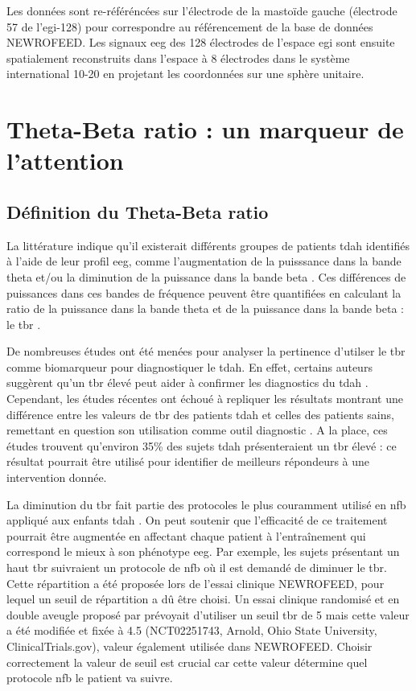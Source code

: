 Les données sont re-référéncées sur l'électrode de la mastoïde gauche (électrode 57 de l'\gls{egi}-128) pour correspondre au référencement de la base
de données NEWROFEED. Les signaux \gls{eeg} des 128 électrodes de l'espace \gls{egi} sont ensuite spatialement reconstruits dans l'espace à 8 électrodes 
dans le système international 10-20 en projetant les coordonnées sur une sphère unitaire.


\section{Theta-Beta ratio : un marqueur de l'attention}

\subsection{Définition du Theta-Beta ratio}
La littérature indique qu'il existerait différents groupes de patients \gls{tdah} identifiés à l'aide de leur profil \gls{eeg}, comme l'augmentation
de la puisssance dans la bande theta et/ou la diminution de la puissance dans la bande beta \citep{Clarke2011, Loo2018}. Ces différences de puissances dans ces 
bandes de fréquence peuvent être quantifiées en calculant la ratio de la puissance dans la bande theta et de la puissance dans la bande beta : le 
\gls{tbr} \citep{Arns2013}. 

De nombreuses études ont été menées pour analyser la pertinence d'utilser le \gls{tbr} comme biomarqueur pour diagnostiquer le \gls{tdah}. En effet, certains auteurs suggèrent qu'un \gls{tbr}
élevé peut aider à confirmer les diagnostics du \gls{tdah} \citep{NebaHealth, Saad2018, FDA}. Cependant, les études récentes ont échoué à repliquer les résultats
montrant une différence entre les valeurs de \gls{tbr} des patients \gls{tdah} et celles des patients sains, remettant en question son utilisation comme outil 
diagnostic \citep{Zhang2017, Arns2013, Clarke2001}. A la place, ces études trouvent qu'environ 35\% des sujets \gls{tdah} présenteraient un \gls{tbr} élevé : ce
résultat pourrait être utilisé pour identifier de meilleurs répondeurs à une intervention donnée. 

La diminution du \gls{tbr} fait partie des protocoles le plus couramment utilisé en \gls{nfb} appliqué aux enfants \gls{tdah} \citep{Arns2014}. 
On peut soutenir que l'efficacité de ce traitement pourrait être augmentée en affectant chaque patient à l'entraînement qui correspond le mieux à son phénotype \gls{eeg}. 
Par exemple, les sujets présentant un haut \gls{tbr} suivraient un protocole de \gls{nfb} où il est demandé de diminuer le \gls{tbr}. Cette répartition a été proposée lors 
de l'essai clinique NEWROFEED, pour lequel un seuil de répartition a dû être choisi. Un essai clinique randomisé et en double aveugle proposé par \citet{Kerson2013} 
prévoyait d'utiliser un seuil \gls{tbr} de 5 mais cette valeur a été modifiée et fixée à 4.5 (NCT02251743, Arnold, Ohio State University, ClinicalTrials.gov), valeur également
utilisée dans NEWROFEED. Choisir correctement la valeur de seuil est crucial car cette valeur détermine quel protocole \gls{nfb} le patient va suivre. 

